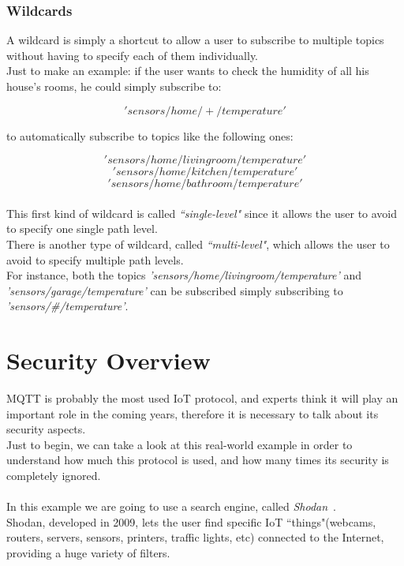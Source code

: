 \documentclass[12pt]{report}
\begin{document}
{{\subsection{Wildcards}
\bigskip
A wildcard is simply a shortcut to allow a user to subscribe to multiple topics without having to specify each of them individually.\\

Just to make an example: if the user wants to check the humidity of all his house's rooms, he could simply subscribe to:

$$'sensors/home/+/temperature'$$

to automatically subscribe to topics like the following ones:

$$'sensors/home/livingroom/temperature'$$
$$'sensors/home/kitchen/temperature'$$
$$'sensors/home/bathroom/temperature'$$\\
This first kind of wildcard is called \emph{``single-level"} since it allows the user to avoid to specify one single path level. \\

There is another type of wildcard, called \emph{``multi-level"}, which allows the user to avoid to specify multiple path levels.\\
For instance, both the topics \emph{'sensors/home/livingroom/temperature'} and \emph{'sensors/garage/temperature'} can be subscribed simply subscribing to \emph{'sensors/\#/temperature'}.\\


\chapter{Security Overview}
\bigskip
MQTT is probably the most used IoT protocol, and experts think it will play an important role in the coming years, therefore it is necessary to talk about its security aspects.\\
Just to begin, we can take a look at this real-world example in order to understand how much this protocol is used, and how many times its security is completely ignored.\\\\
In this example we are going to use a search engine, called \emph{Shodan}~\cite{shodan}.\\
Shodan, developed in 2009, lets the user find specific IoT ``things"(webcams, routers, servers, sensors, printers, traffic lights, etc)  connected to the Internet, providing a huge variety of filters.\\

}}
\end{document}
